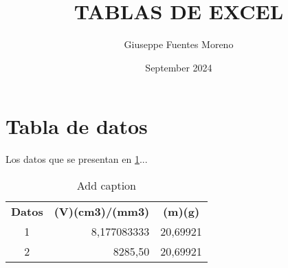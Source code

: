 \documentclass{article}
\title{TABLAS DE EXCEL}
\author{Giuseppe Fuentes Moreno}
\date{September 2024}
\begin{document}
\maketitle

\section{Tabla de datos}

Los datos que se presentan en \ref{tab:addlabel}...


\begin{table}[htbp]
  \centering
  \caption{Add caption}
    \begin{tabular}{crr}
    \rowcolor[rgb]{ 0,  .69,  .941} \textbf{Datos} & \multicolumn{1}{c}{\textbf{(V)(cm3)/(mm3)}} & \multicolumn{1}{c}{\textbf{(m)(g)}} \\
    1     & 8,177083333 & 20,69921 \\
    2     & 8285,50 & 20,69921 \\
    \end{tabular}%
  \label{tab:addlabel}%
\end{table}%

\end{document}
